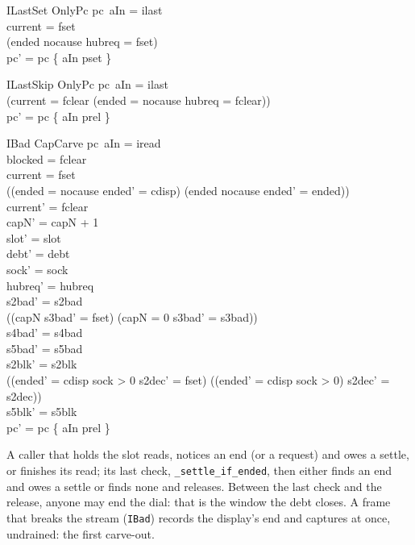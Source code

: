 \documentclass[a4paper,10pt,fleqn]{article}
\begin{document}
\begin{schema}{ILastSet}
  OnlyPc
\where
  pc~aIn = ilast \\
  current = fset \\
  (ended \neq nocause \lor hubreq = fset) \\
  pc' = pc \oplus \{ aIn \mapsto pset \}
\end{schema}

\begin{schema}{ILastSkip}
  OnlyPc
\where
  pc~aIn = ilast \\
  (current = fclear \lor (ended = nocause \land hubreq = fclear)) \\
  pc' = pc \oplus \{ aIn \mapsto prel \}
\end{schema}

\begin{schema}{IBad}
  CapCarve
\where
  pc~aIn = iread \\
  blocked = fclear \\
  current = fset \\
  ((ended = nocause \land ended' = cdisp) \lor (ended \neq nocause \land ended' = ended)) \\
  current' = fclear \\
  capN' = capN + 1 \\
  slot' = slot \\
  debt' = debt \\
  sock' = sock \\
  hubreq' = hubreq \\
  s2bad' = s2bad \\
  ((capN  \land s3bad' = fset) \lor (capN = 0 \land s3bad' = s3bad)) \\
  s4bad' = s4bad \\
  s5bad' = s5bad \\
  s2blk' = s2blk \\
  ((ended' = cdisp \land sock > 0 \land s2dec' = fset) \lor
    (\lnot (ended' = cdisp \land sock > 0) \land s2dec' = s2dec)) \\
  s5blk' = s5blk \\
  pc' = pc \oplus \{ aIn \mapsto prel \}
\end{schema}

A caller that holds the slot reads, notices an end (or a request) and owes a
settle, or finishes its read; its last check, \texttt{\_settle\_if\_ended}, then
either finds an end and owes a settle or finds none and releases.  Between the
last check and the release, anyone may end the dial: that is the window the
debt closes.  A frame that breaks the stream (\texttt{IBad}) records the
display's end and captures at once, undrained: the first carve-out.
\end{document}
